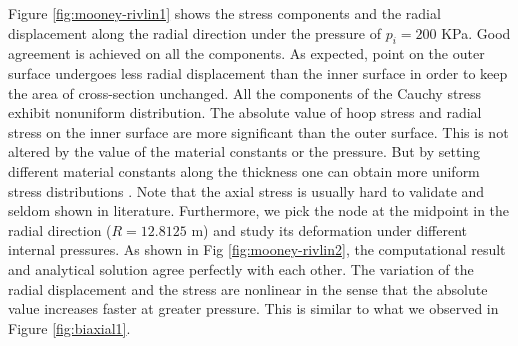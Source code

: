 Figure \ref{fig:mooney-rivlin1} shows the stress components and the radial displacement along the radial direction under the pressure of $p_i = 200$ KPa. Good agreement is achieved on all the components. As expected, point on the outer surface undergoes less radial displacement than the inner surface in order to keep the area of cross-section unchanged. All the components of the Cauchy stress exhibit nonuniform distribution. The absolute value of hoop stress and radial stress on the inner surface are more significant than the outer surface. This is not altered by the value of the material constants or the pressure. But by setting different material constants along the thickness one can obtain more uniform stress distributions \cite{Batra}. Note that the axial stress is usually hard to validate and seldom shown in literature. Furthermore, we pick the node at the midpoint in the radial direction ($R = 12.8125$ m) and study its deformation under different internal pressures. As shown in Fig \ref{fig:mooney-rivlin2}, the computational result and analytical solution agree perfectly with each other. The variation of the radial displacement and the stress are nonlinear in the sense that the absolute value increases faster at greater pressure. This is similar to what we observed in Figure \ref{fig:biaxial1}.

